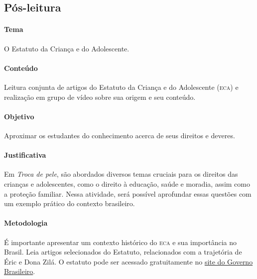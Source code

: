 \documentclass[11pt]{extarticle}
\begin{document}
\subsection{Pós-leitura}


\paragraph{Tema} O Estatuto da Criança e do Adolescente.

\paragraph{Conteúdo} Leitura conjunta de artigos do Estatuto da Criança e do Adolescente (\textsc{eca}) e realização em grupo de vídeo sobre sua origem e seu conteúdo.

\paragraph{Objetivo} Aproximar os estudantes do conhecimento acerca de seus direitos e deveres.

\paragraph{Justificativa} Em \textit{Troca de pele}, são abordados diversos temas cruciais para os direitos das crianças e adolescentes, como o direito à educação, saúde e moradia, assim como a proteção familiar. Nessa atividade, será possível aprofundar essas questões com um exemplo prático do contexto brasileiro.

\paragraph{Metodologia} É importante apresentar um contexto histórico do \textsc{eca} e sua importância no Brasil. Leia artigos selecionados do Estatuto, relacionados com a trajetória de Éric e Dona Zilá. O estatuto pode ser acessado gratuitamente no \href{https://www.gov.br/mdh/pt-br/assuntos/noticias/2021/julho/trinta-e-um-anos-do-estatuto-da-crianca-e-do-adolescente-confira-as-novas-acoes-para-fortalecer-o-eca/ECA2021_Digital.pdf}{site do Governo Brasileiro}. 
\end{document}
